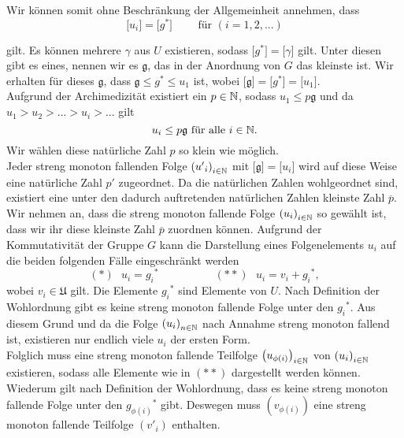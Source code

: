 {%
Wir können somit ohne Beschränkung der Allgemeinheit annehmen, dass
\[\lbrack u_i \rbrack = \lbrack g^*\rbrack ~~~~~~~~~\text{ für }\left(i = 1, 2,...\right)\]

gilt.
%
Es können mehrere $\gamma$ aus $U$ existieren, sodass $\lbrack g^*\rbrack=\lbrack\gamma\rbrack$ gilt. Unter diesen gibt es eines, nennen wir es $\mathfrak{g}$, das in der Anordnung von $G$ das kleinste ist. Wir erhalten für dieses $\mathfrak{g}$, dass $\mathfrak{g}\leq g^*\leq u_1$ ist, wobei $\lbrack \mathfrak{g}\rbrack = \lbrack g^*\rbrack = \lbrack u_1 \rbrack$.\\
%
%
Aufgrund der Archimedizität existiert ein $p \in \mathbb{N}$, sodass $u_1 \le p\mathfrak{g}$ und da $u_1 > u_2 > ... > u_i > ...$ gilt 
\[u_i \le p\mathfrak{g}\text{ für alle }i \in \mathbb{N}.\] 
%
%
Wir wählen diese natürliche Zahl $p$ so klein wie möglich. \\
%
%
Jeder streng monoton fallenden Folge $\left({u'}_i\right)_{i\in\mathbb{N}}$ mit $\lbrack \mathfrak{g}\rbrack = \lbrack u_i \rbrack$ %
wird auf diese Weise eine natürliche Zahl $p'$ zugeordnet. Da die natürlichen Zahlen wohlgeordnet sind, existiert eine unter den dadurch auftretenden natürlichen Zahlen kleinste Zahl $\overline{p}$. Wir nehmen an, dass die streng monoton fallende Folge $\left(u_i\right)_{i\in\mathbb{N}}$ so gewählt ist, dass wir ihr diese kleinste Zahl $\overline{p}$ zuordnen können.
%
%
%
%
Aufgrund der Kommutativität der Gruppe $G$ kann die Darstellung eines Folgenelements $u_i$ auf die beiden folgenden Fälle eingeschränkt werden
%
\[
(*)~~~ u_i = {g_i}^* ~~~~~~~~~~~~~~~~~~~~~~~   (**)~~~    u_i = v_i+{g_i}^*,
\]
%
%
%
wobei $v_i \in \mathfrak{U}$ gilt. 
Die Elemente ${g_i}^*$ sind Elemente von $U$. Nach Definition der Wohlordnung gibt es keine streng monoton fallende Folge unter den ${g_i}^*$. Aus diesem Grund und da die Folge ${\left(u_i\right)}_{n\in \mathbb{N}}$ nach Annahme streng monoton fallend ist, existieren nur endlich viele $u_i$ der ersten Form. \\
%
%
%
%

%
%
%
Folglich muss eine streng monoton fallende Teilfolge $\left(u_{\phi(i)}\right)_{i\in\mathbb{N}}$ von $\left(u_i\right)_{i\in\mathbb{N}}$ existieren, sodass alle Elemente wie in $(**)$ dargestellt werden können. Wiederum gilt nach Definition der Wohlordnung, dass es keine streng monoton fallende Folge unter den ${g_{\phi(i)}}^*$  gibt. Deswegen muss $\left({v_{\phi(i)}}\right)$ eine streng monoton fallende Teilfolge $\left({{v'}_{i}}\right) $ enthalten.

}
